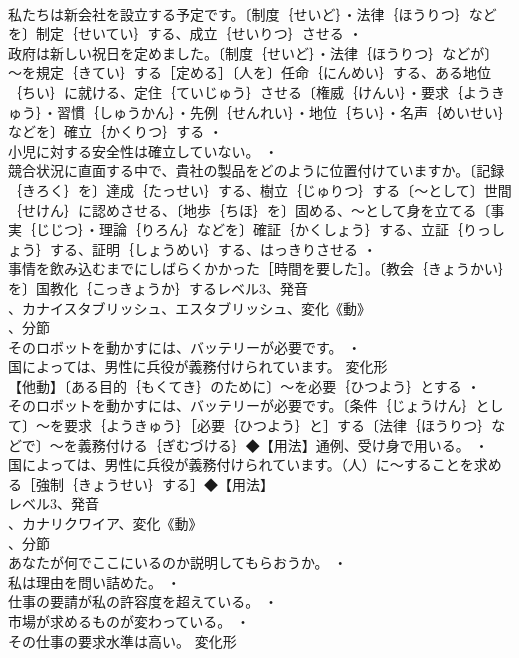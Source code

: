 \documentclass[8pt]{extreport}
\begin{document}
\begin{CJK}{UTF8}{min}
\\	私たちは新会社を設立する予定です。〔制度｛せいど｝・法律｛ほうりつ｝などを〕制定｛せいてい｝する、成立｛せいりつ｝させる ・
\\	政府は新しい祝日を定めました。〔制度｛せいど｝・法律｛ほうりつ｝などが〕～を規定｛きてい｝する［定める］〔人を〕任命｛にんめい｝する、ある地位｛ちい｝に就ける、定住｛ていじゅう｝させる〔権威｛けんい｝・要求｛ようきゅう｝・習慣｛しゅうかん｝・先例｛せんれい｝・地位｛ちい｝・名声｛めいせい｝などを〕確立｛かくりつ｝する ・
\\	小児に対する安全性は確立していない。 ・
\\	競合状況に直面する中で、貴社の製品をどのように位置付けていますか。〔記録｛きろく｝を〕達成｛たっせい｝する、樹立｛じゅりつ｝する〔～として〕世間｛せけん｝に認めさせる、〔地歩｛ちほ｝を〕固める、～として身を立てる〔事実｛じじつ｝・理論｛りろん｝などを〕確証｛かくしょう｝する、立証｛りっしょう｝する、証明｛しょうめい｝する、はっきりさせる ・
\\	事情を飲み込むまでにしばらくかかった［時間を要した］。〔教会｛きょうかい｝を〕国教化｛こっきょうか｝するレベル3、発音
\\	、カナイスタブリッシュ、エスタブリッシュ、変化《動》
\\	、分節
\\	そのロボットを動かすには、バッテリーが必要です。 ・
\\	国によっては、男性に兵役が義務付けられています。	変化形 
\\	【他動】〔ある目的｛もくてき｝のために〕～を必要｛ひつよう｝とする ・
\\	そのロボットを動かすには、バッテリーが必要です。〔条件｛じょうけん｝として〕～を要求｛ようきゅう｝［必要｛ひつよう｝と］する〔法律｛ほうりつ｝などで〕～を義務付ける｛ぎむづける｝◆【用法】通例、受け身で用いる。 ・
\\	国によっては、男性に兵役が義務付けられています。（人）に～することを求める［強制｛きょうせい｝する］◆【用法】
\\	レベル3、発音
\\	、カナリクワイア、変化《動》
\\	、分節
\\	あなたが何でここにいるのか説明してもらおうか。 ・
\\	私は理由を問い詰めた。 ・
\\	仕事の要請が私の許容度を超えている。 ・
\\	市場が求めるものが変わっている。 ・
\\	その仕事の要求水準は高い。	変化形 

\end{CJK}
\end{document}
